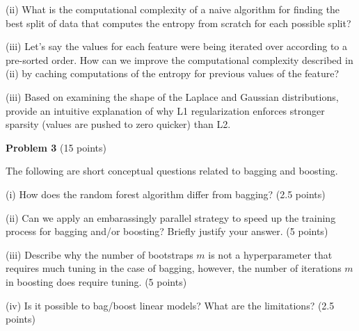\documentclass[letterpaper, 11pt]{article}
\newcommand{\problemAnswer}[1]{%
	\noindent\framebox[0.95\columnwidth][c]{\begin{minipage}{0.92\columnwidth}\color{blue}{#1}\end{minipage}} %
}
\begin{document}
(ii) What is the computational complexity of a naive algorithm for finding the best split of data that computes the entropy from scratch for each possible split?

\problemAnswer{
	
	
	\vspace*{100pt}
}

(iii) Let's say the values for each feature were being iterated over according to a pre-sorted order. How can we improve the computational complexity described in (ii) by caching computations of the entropy for previous values of the feature?

\vspace{1em}



(iii) Based on examining the shape of the Laplace and Gaussian distributions, provide an intuitive explanation of why L1 regularization enforces stronger sparsity (values are pushed to zero quicker) than L2.


\problemAnswer{

	
	\vspace*{100pt}
}



\vspace{1em}



{\large\textbf{Problem 3}} (15 points)

The following are short conceptual questions related to bagging and boosting.


(i) How does the random forest algorithm differ from bagging? (2.5 points)

(ii) Can we apply an embarassingly parallel strategy to speed up the training process for bagging and/or boosting? Briefly justify your answer. (5 points)

(iii) Describe why the number of bootstraps $m$ is not a hyperparameter that requires much tuning in the case of bagging, however, the number of iterations $m$ in boosting does require tuning. (5 points)

(iv) Is it possible to bag/boost linear models? What are the limitations? (2.5 points)

\problemAnswer{
	
	
	\vspace*{150pt}
}


\vspace{1em}
\end{document}
